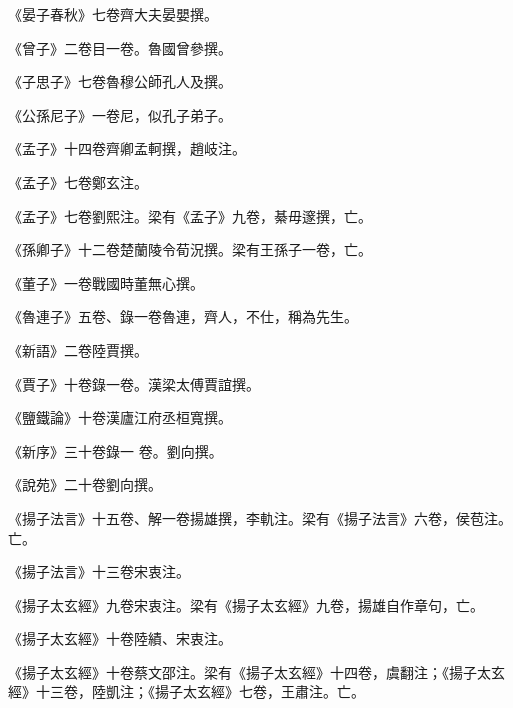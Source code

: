 
\begin{pinyinscope}

 《晏子春秋》七卷齊大夫晏嬰撰。



 《曾子》二卷目一卷。魯國曾參撰。



 《子思子》七卷魯穆公師孔人及撰。



 《公孫尼子》一卷尼，似孔子弟子。



 《孟子》十四卷齊卿孟軻撰，趙岐注。



 《孟子》七卷鄭玄注。



 《孟子》七卷劉熙注。梁有《孟子》九卷，綦毋邃撰，亡。



 《孫卿子》十二卷楚蘭陵令荀況撰。梁有王孫子一卷，亡。



 《董子》一卷戰國時董無心撰。



 《魯連子》五卷、錄一卷魯連，齊人，不仕，稱為先生。



 《新語》二卷陸賈撰。



 《賈子》十卷錄一卷。漢梁太傅賈誼撰。



 《鹽鐵論》十卷漢廬江府丞桓寬撰。



 《新序》三十卷錄一
 卷。劉向撰。



 《說苑》二十卷劉向撰。



 《揚子法言》十五卷、解一卷揚雄撰，李軌注。梁有《揚子法言》六卷，侯苞注。亡。



 《揚子法言》十三卷宋衷注。



 《揚子太玄經》九卷宋衷注。梁有《揚子太玄經》九卷，揚雄自作章句，亡。



 《揚子太玄經》十卷陸績、宋衷注。



 《揚子太玄經》十卷蔡文邵注。梁有《揚子太玄經》十四卷，虞翻注；《揚子太玄經》十三卷，陸凱注；《揚子太玄經》七卷，王肅注。亡。




\end{pinyinscope}
